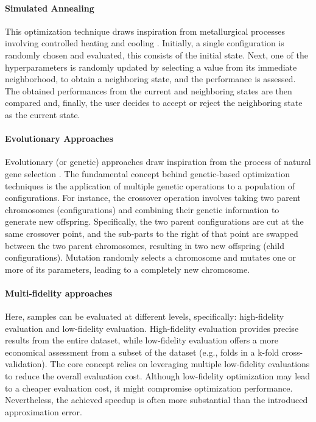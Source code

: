 \paragraph{Simulated Annealing}
This optimization technique draws inspiration from metallurgical processes involving controlled heating and cooling \cite{61}.
Initially, a single configuration is randomly chosen and evaluated, this consists of the initial state.
Next, one of the hyperparameters is randomly updated by selecting a value from its immediate neighborhood, to obtain a neighboring state, and the performance is assessed.
The obtained performances from the current and neighboring states are then compared and, finally, the user decides to accept or reject the neighboring state as the current state.

\paragraph{Evolutionary Approaches}
Evolutionary (or genetic) approaches draw inspiration from the process of natural gene selection \cite{49}.
The fundamental concept behind genetic-based optimization techniques is the application of multiple genetic operations to a population of configurations.
For instance, the crossover operation involves taking two parent chromosomes (configurations) and combining their genetic information to generate new offspring.
Specifically, the two parent configurations are cut at the same crossover point, and the sub-parts to the right of that point are swapped between the two parent chromosomes, resulting in two new offspring (child configurations).
Mutation randomly selects a chromosome and mutates one or more of its parameters, leading to a completely new chromosome.

\paragraph{Multi-fidelity approaches}
Here, samples can be evaluated at different levels, specifically: high-fidelity evaluation and low-fidelity evaluation.
High-fidelity evaluation provides precise results from the entire dataset, while low-fidelity evaluation offers a more economical assessment from a subset of the dataset (e.g., folds in a k-fold cross-validation).
The core concept relies on leveraging multiple low-fidelity evaluations to reduce the overall evaluation cost.
Although low-fidelity optimization may lead to a cheaper evaluation cost, it might compromise optimization performance.
Nevertheless, the achieved speedup is often more substantial than the introduced approximation error.

